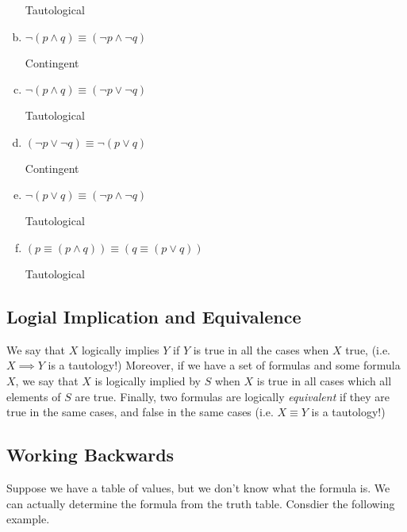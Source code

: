 \begin{problem}
\begin{enumerate}[a.]
\ifKey
\color{red}
\hfill Tautological 
\color{black}
\fi

\item $\neg (p \land q) \equiv (\neg p \land \neg q)$

\ifKey
\color{red}
\hfill Contingent
\color{black}
\fi

\item $\neg (p \land q) \equiv (\neg p \lor \neg q)$

\ifKey
\color{red}
\hfill Tautological 
\color{black}
\fi

\item $ (\neg p \lor \neg q) \equiv \neg( p \lor  q)$

\ifKey
\color{red}
\hfill Contingent 
\color{black}
\fi

\item $\neg (p \lor q) \equiv (\neg p \land \neg q)$

\ifKey
\color{red}
\hfill Tautological 
\color{black}
\fi

\item $(p \equiv (p \land q)) \equiv (q \equiv (p \lor  q))$

\ifKey
\color{red}
\hfill Tautological 
\color{black}
\fi

\end{enumerate}
\end{problem}  

\newpage
\subsection*{Logial Implication and Equivalence}  
We say that $X$  logically implies $Y$ if $Y$ is true in all the cases when $X$ true, (i.e. $X \implies Y$ is a tautology!)  Moreover, if we have a set of formulas and some formula $X$, we say that $X$ is logically implied by $S$ when $X$ is true in all cases which all elements of $S$ are true.  Finally, two formulas are logically \emph{equivalent} if they are true in the same cases, and false in the same cases (i.e. $X\equiv Y$ is a tautology!)

\subsection*{Working Backwards}
Suppose we have a table of values, but we don't know what the formula is.  We can actually determine the formula from the truth table.  Consdier the following example.


